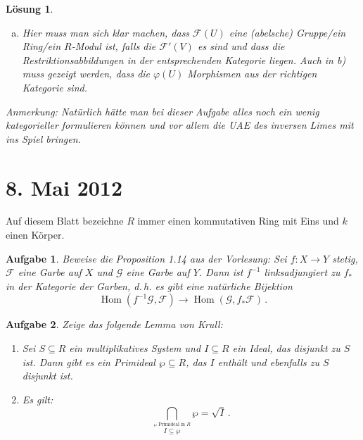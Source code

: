 \documentclass[a4paper,12pt]{report}
\theoremstyle{break}
\newtheorem{Aufg}{Aufgabe}
\newtheorem{Loes}{L\"osung}
\theoremstyle{nonumberbreak}
\theoremstyle{nonumberplain}
\DeclareMathOperator{\Hom}{Hom}
\newcommand{\F}{\mathcal{F}} %
\newcommand{\G}{\mathcal{G}} %
\begin{document}
\begin{Loes}
\begin{enumerate}[a)]
Sei $f \in \F(U)$. F\"ur alle $V \subseteq U, V \in \mathcal{B}$ sind die Schnitte $\rho^U_V(\varphi(U)(f)) = \varphi(V)(\rho^U_V(f)) \in \G(V)$ festgelegt und bilden eine konsistente Familie in $\G$. Da $\G$ eine Garbe ist, ist $\varphi(U)(f) \in \G(U)$ damit eindeutig bestimmt.

Ist $U' \subseteq U \subseteq X$ offen, dann ist jedes $V \subseteq U', V \in \mathcal{B}$ auch in $U$ enthalten. Es gilt $\rho^{U'}_V(\rho^U_{U'}(\varphi(U)(f))) = \rho^U_V(\varphi(U)(f)) = \varphi(V)(\rho^U_V(f))$, also ist $\rho^U_{U'}(\varphi(U)(f))$ ein Amalgam f\"ur die $\varphi(V)(\rho^U_V(f))$ und es gilt $\rho^U_{U'}(\varphi(U)(f)) = \varphi(U')(\rho^U_ {U'}(f))$. 

\item Hier muss man sich klar machen, dass $\F(U)$ eine (abelsche) Gruppe/ein Ring/ein $R$-Modul ist, falls die $\F'(V)$ es sind und dass die Restriktionsabbildungen in der entsprechenden Kategorie liegen. Auch in b) muss gezeigt werden, dass die $\varphi(U)$ Morphismen aus der richtigen Kategorie sind.
\end{enumerate}

\textit{Anmerkung:} Nat\"urlich h\"atte man bei dieser Aufgabe alles noch ein wenig kategorieller formulieren k\"onnen und vor allem die UAE des inversen Limes mit ins Spiel bringen.
\end{Loes}

\newpage
\section{8. Mai 2012}
\setcounter{Aufg}{0}
\setcounter{Loes}{0}

Auf diesem Blatt bezeichne $R$ immer einen kommutativen Ring mit Eins und $k$ einen %
Körper.

\begin{Aufg}
 Beweise die Proposition 1.14 aus der Vorlesung:
Sei $f\colon X\to Y$ stetig, $\mathcal{F}$ eine Garbe auf $X$ und $\G$ eine Garbe auf $Y$.
Dann ist $f^{-1}$ linksadjungiert zu $f_\ast$ in der Kategorie der Garben, d.\,h. es gibt eine natürliche Bijektion 
$$\Hom(f^{-1}\G, \F) \to \Hom(\G, f_\ast \F) \,.$$
\end{Aufg}

 
\begin{Aufg}
Zeige das folgende Lemma von Krull:
\begin{enumerate}%
 \item Sei $S \subseteq R$ ein multiplikatives System und $I \subseteq R$ ein Ideal, das disjunkt zu $S$ ist.
Dann gibt es ein Primideal $\wp \subseteq R$, das $I$ enthält und ebenfalls zu $S$ disjunkt ist.
 \item Es gilt: $$\bigcap_{\stackrel{\wp \textrm{ Primideal in } R}{I \subseteq \wp}} \wp = \sqrt{I}\,.$$
\end{enumerate}
\end{Aufg}
\end{document}
